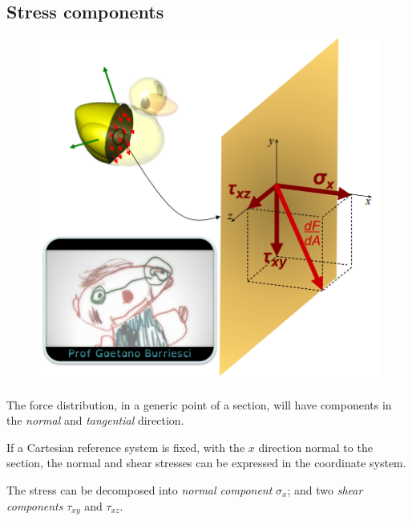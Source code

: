 \documentclass[class=report, crop=false, 12pt,a4paper]{standalone}
\begin{document}
\subsection{Stress components}
\begin{minipage}{0.4\textwidth}
    \begin{figure}[H]
        \centering
        \includegraphics[width = \textwidth]{../img/diagram39.png}
        \caption{}
    \end{figure}  
\end{minipage}
\begin{minipage}{0.05\textwidth}
    \hfill
\end{minipage}
\begin{minipage}{0.55\textwidth}
    The force distribution, in a generic point of a section, will have components in the \textit{normal} and \textit{tangential} direction. 
    
    If a Cartesian reference system is fixed, with the $x$ direction normal to the section, the normal and shear stresses can be expressed in the coordinate system. 
    
    The stress can be decomposed into \textit{normal component} $\sigma_x$; and two \textit{shear components} $\tau_{xy}$ and $\tau_{xz}$.
\end{minipage}
\end{document}
